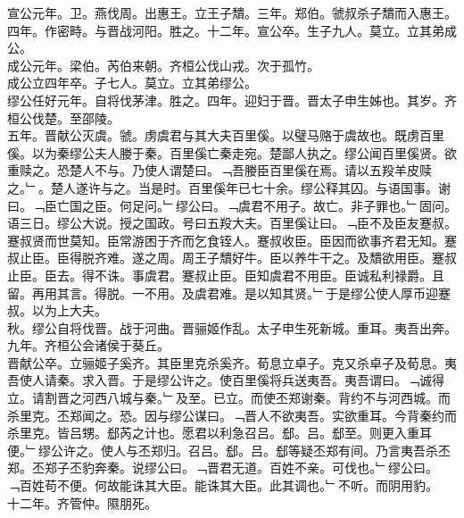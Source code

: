 \documentclass{zhvt-classic}
\begin{document}
\hspace*{2em}宣公元年。卫。燕伐周。出惠王。立王子穨。三年。郑伯。虢叔杀子穨而入惠王。四年。作密畤。与晋战河阳。胜之。十二年。宣公卒。生子九人。莫立。立其弟成公。\\
\hspace*{2em}成公元年。梁伯。芮伯来朝。齐桓公伐山戎。次于孤竹。\\
\hspace*{2em}成公立四年卒。子七人。莫立。立其弟缪公。\\
\hspace*{2em}缪公任好元年。自将伐茅津。胜之。四年。迎妇于晋。晋太子申生姊也。其岁。齐桓公伐楚。至邵陵。\\
\hspace*{2em}五年。晋献公灭虞。虢。虏虞君与其大夫百里傒。以璧马赂于虞故也。既虏百里傒。以为秦缪公夫人媵于秦。百里傒亡秦走宛。楚鄙人执之。缪公闻百里傒贤。欲重赎之。恐楚人不与。乃使人谓楚曰。﹁吾媵臣百里傒在焉。请以五羖羊皮赎之。﹂。楚人遂许与之。当是时。百里傒年已七十余。缪公释其囚。与语国事。谢曰。﹁臣亡国之臣。何足问。﹂缪公曰。﹁虞君不用子。故亡。非子罪也。﹂固问。语三日。缪公大说。授之国政。号曰五羖大夫。百里傒让曰。﹁臣不及臣友蹇叔。蹇叔贤而世莫知。臣常游困于齐而乞食铚人。蹇叔收臣。臣因而欲事齐君无知。蹇叔止臣。臣得脱齐难。遂之周。周王子穨好牛。臣以养牛干之。及穨欲用臣。蹇叔止臣。臣去。得不诛。事虞君。蹇叔止臣。臣知虞君不用臣。臣诚私利禄爵。且留。再用其言。得脱。一不用。及虞君难。是以知其贤。﹂于是缪公使人厚币迎蹇叔。以为上大夫。\\
\hspace*{2em}秋。缪公自将伐晋。战于河曲。晋骊姬作乱。太子申生死新城。重耳。夷吾出奔。\\
\hspace*{2em}九年。齐桓公会诸侯于葵丘。\\
\hspace*{2em}晋献公卒。立骊姬子奚齐。其臣里克杀奚齐。荀息立卓子。克又杀卓子及荀息。夷吾使人请秦。求入晋。于是缪公许之。使百里傒将兵送夷吾。夷吾谓曰。﹁诚得立。请割晋之河西八城与秦。﹂及至。已立。而使丕郑谢秦。背约不与河西城。而杀里克。丕郑闻之。恐。因与缪公谋曰。﹁晋人不欲夷吾。实欲重耳。今背秦约而杀里克。皆吕甥。郄芮之计也。愿君以利急召吕。郄。吕。郄至。则更入重耳便。﹂缪公许之。使人与丕郑归。召吕。郄。吕。郄等疑丕郑有间。乃言夷吾杀丕郑。丕郑子丕豹奔秦。说缪公曰。﹁晋君无道。百姓不亲。可伐也。﹂缪公曰。﹁百姓苟不便。何故能诛其大臣。能诛其大臣。此其调也。﹂不听。而阴用豹。\\
\hspace*{2em}十二年。齐管仲。隰朋死。\\
\end{document}
